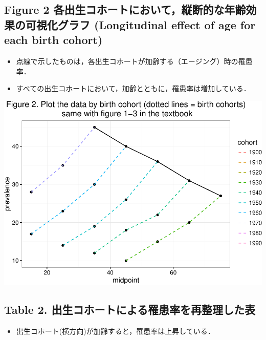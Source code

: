 \documentclass[11pt,]{article}
\providecommand{\tightlist}{%
  \setlength{\itemsep}{0pt}\setlength{\parskip}{0pt}}
\begin{document}
\subsection{Figure 2
各出生コホートにおいて，縦断的な年齢効果の可視化グラフ (Longitudinal
effect of age for each birth
cohort)}\label{figure-2--longitudinal-effect-of-age-for-each-birth-cohort}

\begin{itemize}
\tightlist
\item
  点線で示したものは，各出生コホートが加齢する（エージング）時の罹患率．
\item
  すべての出生コホートにおいて，加齢とともに，罹患率は増加している．
\end{itemize}

\includegraphics{guidance_files/figure-latex/unnamed-chunk-4-1.pdf}

\subsection{Table 2.
出生コホートによる罹患率を再整理した表}\label{table-2.-}

\begin{itemize}
\tightlist
\item
  出生コホート(横方向)が加齢すると，罹患率は上昇している．
\end{itemize}
\end{document}

